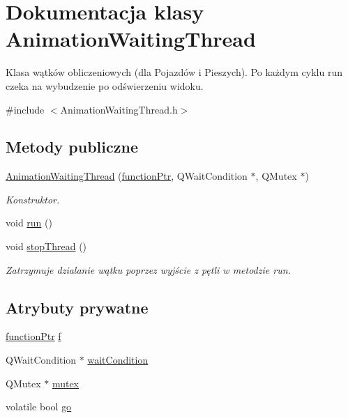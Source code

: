 \hypertarget{class_animation_waiting_thread}{\section{Dokumentacja klasy Animation\-Waiting\-Thread}
\label{class_animation_waiting_thread}
}


Klasa wątków obliczeniowych (dla Pojazdów i Pieszych). Po każdym cyklu run czeka na wybudzenie po odświerzeniu widoku.  




{\ttfamily \#include $<$Animation\-Waiting\-Thread.\-h$>$}

\subsection*{Metody publiczne}
\begin{DoxyCompactItemize}
\item 
\hyperlink{class_animation_waiting_thread_a09dc2720a50b0db3b18b278de850ff55}{Animation\-Waiting\-Thread} (\hyperlink{_types_8h_afaef7be4497cef01f6bda50ac57e44cb}{function\-Ptr}, Q\-Wait\-Condition $\ast$, Q\-Mutex $\ast$)
\begin{DoxyCompactList}\small\item\em Konstruktor. \end{DoxyCompactList}\item 
void \hyperlink{class_animation_waiting_thread_a8fd07e8c8fbdc3e577a0816cee4dafde}{run} ()
\item 
void \hyperlink{class_animation_waiting_thread_a2855e25b20c91a51c5e8263c73b30e06}{stop\-Thread} ()
\begin{DoxyCompactList}\small\item\em Zatrzymuje dzialanie wątku poprzez wyjście z pętli w metodzie run. \end{DoxyCompactList}\end{DoxyCompactItemize}
\subsection*{Atrybuty prywatne}
\begin{DoxyCompactItemize}
\item 
\hyperlink{_types_8h_afaef7be4497cef01f6bda50ac57e44cb}{function\-Ptr} \hyperlink{class_animation_waiting_thread_a63562f5dea2e199512e37979f3d5ccae}{f}
\item 
Q\-Wait\-Condition $\ast$ \hyperlink{class_animation_waiting_thread_aa9a37309d858623088bec9599fbcf135}{wait\-Condition}
\item 
Q\-Mutex $\ast$ \hyperlink{class_animation_waiting_thread_ad6c84d789d5d43eed9729e7d4a2d26e4}{mutex}
\item 
volatile bool \hyperlink{class_animation_waiting_thread_a51ffa401c81a925e068af99919940994}{go}
\end{DoxyCompactItemize}


